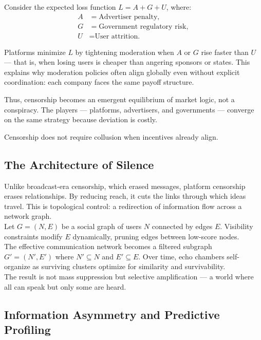 \documentclass[12pt,twoside]{book}
\begin{document}
Consider the expected loss function \(L = A + G + U\), where:
\[
\begin{aligned}
A &= \text{Advertiser penalty},\\
G &= \text{Government regulatory risk},\\
U &= \text{User attrition.}
\end{aligned}
\]

Platforms minimize \(L\) by tightening moderation when \(A\) or \(G\) rise faster than \(U\) --- that is, when losing users is cheaper than angering sponsors or states.  
This explains why moderation policies often align globally even without explicit coordination: each company faces the same payoff structure.

Thus, censorship becomes an emergent equilibrium of market logic, not a conspiracy.  
The players --- platforms, advertisers, and governments --- converge on the same strategy because deviation is costly. \\

\begin{keyidea}
Censorship does not require collusion when incentives already align.
\end{keyidea}

\subsection*{The Architecture of Silence}

Unlike broadcast-era censorship, which erased messages, platform censorship erases relationships.  
By reducing reach, it cuts the links through which ideas travel.  
This is topological control: a redirection of information flow across a network graph.\\

Let \(G=(N,E)\) be a social graph of users \(N\) connected by edges \(E\).  
Visibility constraints modify \(E\) dynamically, pruning edges between low-score nodes. \\  

The effective communication network becomes a filtered subgraph \(G'=(N',E')\) where \(N' \subseteq N\) and \(E' \subseteq E\). Over time, echo chambers self-organize as surviving clusters optimize for similarity and survivability.\\

The result is not mass suppression but selective amplification --- a world where all can speak but only some are heard.

\subsection*{Information Asymmetry and Predictive Profiling}
\end{document}
